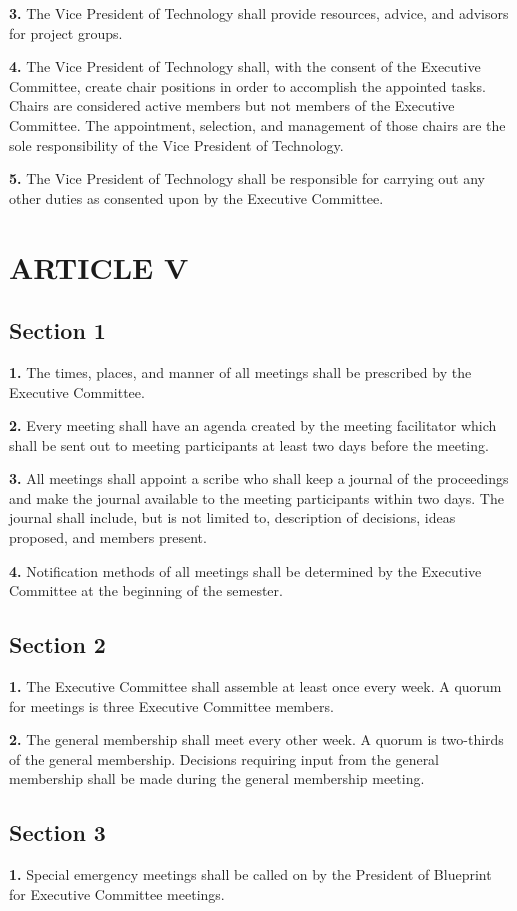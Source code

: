 \documentclass{article}
\begin{document}
\textbf{3.} The Vice President of Technology shall provide resources, advice, and advisors for project groups.

\textbf{4.} The Vice President of Technology shall, with the consent of the Executive Committee, create chair positions in order to accomplish the appointed tasks. Chairs are considered active members but not members of the Executive Committee. The appointment, selection, and management of those chairs are the sole responsibility of the Vice President of Technology.

\textbf{5.} The Vice President of Technology shall be responsible for carrying out any other duties as consented upon by the Executive Committee.

\section{ARTICLE V}
\subsection{Section 1}
\textbf{1.} The times, places, and manner of all meetings shall be prescribed by the Executive Committee.

\textbf{2.} Every meeting shall have an agenda created by the meeting facilitator which shall be sent out to meeting participants at least two days before the meeting.

\textbf{3.} All meetings shall appoint a scribe who shall keep a journal of the proceedings and make the journal available to the meeting participants within two days. The journal shall include, but is not limited to, description of decisions, ideas proposed, and members present.

\textbf{4.} Notification methods of all meetings shall be determined by the Executive Committee at the beginning of the semester.

\subsection{Section 2}
\textbf{1.} The Executive Committee shall assemble at least once every week. A quorum for meetings is three Executive Committee members.

\textbf{2.} The general membership shall meet every other week. A quorum is two-thirds of the general membership. Decisions requiring input from the general membership shall be made during the general membership meeting.

\subsection{Section 3}
\textbf{1.} Special emergency meetings shall be called on by the President of Blueprint for Executive Committee meetings.
\end{document}
